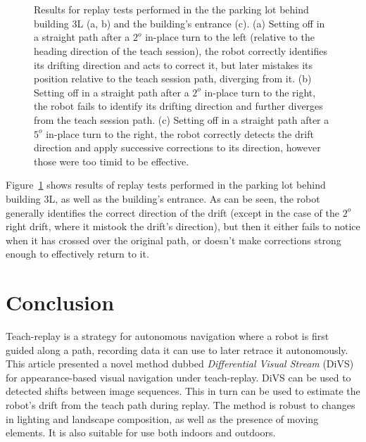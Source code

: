 \documentclass[twocolumn, 9pt,fleqn]{jsproceedings}
\begin{document}
\begin{figure}[h!]
\centering
{}\\
\\
\caption{Results for replay tests performed in the the parking lot behind building 3L (a, b) and the building's entrance (c). (a) Setting off in a straight path after a $2^o$ in-place turn to the left (relative to the heading direction of the teach session), the robot correctly identifies its drifting direction and acts to correct it, but later mistakes its position relative to the teach session path, diverging from it. (b) Setting off in a straight path after a $2^o$ in-place turn to the right, the robot fails to identify its drifting direction and further diverges from the teach session path. (c) Setting off in a straight path after a $5^o$ in-place turn to the right, the robot correctly detects the drift direction and apply successive corrections to its direction, however those were too timid to be effective.}
\label{fig:replay_tests}
\end{figure}

Figure~\ref{fig:replay_tests} shows results of replay tests performed in the parking lot behind building 3L, as well as the building's entrance. As can be seen, the robot generally identifies the correct direction of the drift (except in the case of the $2^o$ right drift, where it mistook the drift's direction), but then it either fails to notice when it has crossed over the original path, or doesn't make corrections strong enough to effectively return to it.

\section{Conclusion}

Teach-replay is a strategy for autonomous navigation where a robot is first guided along a path, recording data it can use to later retrace it autonomously. This article presented a novel method dubbed \textit{Differential Visual Stream} (DiVS) for appearance-based visual navigation under teach-replay. DiVS can be used to detected shifts between image sequences. This in turn can be used to estimate the robot's drift from the teach path during replay. The method is robust to changes in lighting and landscape composition, as well as the presence of moving elements. It is also suitable for use both indoors and outdoors.
\end{document}
